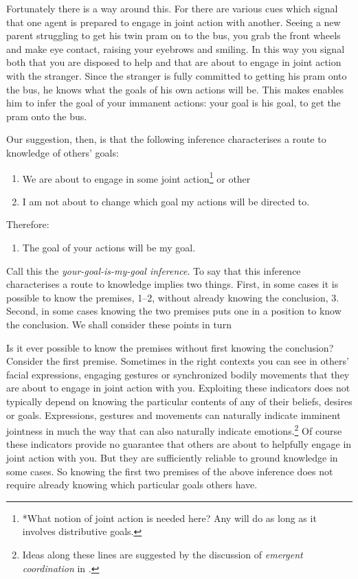 \documentclass[12pt,a4paper]{extarticle}
\begin{document}
Fortunately there is a way around this.  
For there are various cues which signal that one agent is prepared to engage in joint action with another.  
Seeing a new parent struggling to get his twin pram on to the bus, you grab the front wheels and make eye contact, raising your eyebrows and smiling.  
In this way you signal both that you are disposed to help 
and 
that are about to engage in joint action with the stranger.  
Since the stranger is fully committed to getting his pram onto the bus,
he knows what the goals of his own actions will be.
This makes enables him to infer the goal of your immanent actions: 
your goal is his goal, to get the pram onto the bus.

Our suggestion, then, is that the following inference characterises a route to knowledge of others’ goals:
%
\begin{enumerate}
\item We are about to engage in some joint action\footnote{
*What notion of joint action is needed here?  Any will do as long as it involves distributive goals.
}
or other 

\item I am not about to change which goal my actions will be directed to.

\end{enumerate}
%
Therefore:
%
\begin{enumerate}[resume]
%
\item The goal of your actions will be my goal.
\end{enumerate}
%
Call this the \emph{your-goal-is-my-goal inference}.  
To say that this inference characterises a route to knowledge implies two things.  
First, in some cases it is possible to know the premises, 1–2, without already knowing the conclusion, 3.  
Second, in some cases knowing the two premises puts one in a position to know the conclusion.  
We shall consider these points in turn


Is it ever possible to know the premises without first knowing the conclusion?  
Consider the first premise.  
Sometimes 
in the right contexts
you can see in others’ facial expressions, engaging gestures or synchronized bodily movements that they are about to engage in joint action with you.  
Exploiting these indicators does not typically depend on knowing the particular contents of any of their beliefs, desires or goals.  
Expressions, gestures and movements can naturally indicate imminent jointness in much the way that can also naturally indicate emotions.\footnote{
Ideas along these lines are suggested by the discussion of \emph{emergent coordination} in \citet{Knoblich:2010fk}.
}  
Of course these indicators provide no guarantee that others are about to helpfully engage in joint action with you.  
But they are sufficiently reliable to ground knowledge in some cases.  
So knowing the first two premises of the above inference does not require already knowing which particular goals others have.  
\end{document}
